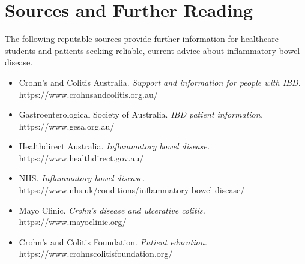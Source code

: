 \section*{Sources and Further Reading}
The following reputable sources provide further information for healthcare students and patients seeking reliable, current advice about inflammatory bowel disease.
\begin{itemize}
    \item Crohn's and Colitis Australia. \textit{Support and information for people with IBD.} https://www.crohnsandcolitis.org.au/
    \item Gastroenterological Society of Australia. \textit{IBD patient information.} https://www.gesa.org.au/
    \item Healthdirect Australia. \textit{Inflammatory bowel disease.} https://www.healthdirect.gov.au/
    \item NHS. \textit{Inflammatory bowel disease.} https://www.nhs.uk/conditions/inflammatory-bowel-disease/
    \item Mayo Clinic. \textit{Crohn's disease and ulcerative colitis.} https://www.mayoclinic.org/
    \item Crohn's and Colitis Foundation. \textit{Patient education.} https://www.crohnscolitisfoundation.org/
\end{itemize}
